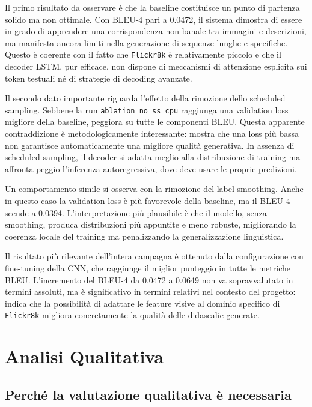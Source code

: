 \documentclass[11pt,a4paper]{report}
\newcommand{\dataset}{\texttt{Flickr8k}}
\begin{document}
Il primo risultato da osservare è che la baseline costituisce un punto di partenza solido ma non ottimale. Con BLEU-4 pari a 0.0472, il sistema dimostra di essere in grado di apprendere una corrispondenza non banale tra immagini e descrizioni, ma manifesta ancora limiti nella generazione di sequenze lunghe e specifiche. Questo è coerente con il fatto che \dataset{} è relativamente piccolo e che il decoder LSTM, pur efficace, non dispone di meccanismi di attenzione esplicita sui token testuali né di strategie di decoding avanzate.

Il secondo dato importante riguarda l'effetto della rimozione dello scheduled sampling. Sebbene la run \texttt{ablation\_no\_ss\_cpu} raggiunga una validation loss migliore della baseline, peggiora su tutte le componenti BLEU. Questa apparente contraddizione è metodologicamente interessante: mostra che una loss più bassa non garantisce automaticamente una migliore qualità generativa. In assenza di scheduled sampling, il decoder si adatta meglio alla distribuzione di training ma affronta peggio l'inferenza autoregressiva, dove deve usare le proprie predizioni.

Un comportamento simile si osserva con la rimozione del label smoothing. Anche in questo caso la validation loss è più favorevole della baseline, ma il BLEU-4 scende a 0.0394. L'interpretazione più plausibile è che il modello, senza smoothing, produca distribuzioni più appuntite e meno robuste, migliorando la coerenza locale del training ma penalizzando la generalizzazione linguistica.

Il risultato più rilevante dell'intera campagna è ottenuto dalla configurazione con fine-tuning della CNN, che raggiunge il miglior punteggio in tutte le metriche BLEU. L'incremento del BLEU-4 da 0.0472 a 0.0649 non va sopravvalutato in termini assoluti, ma è significativo in termini relativi nel contesto del progetto: indica che la possibilità di adattare le feature visive al dominio specifico di \dataset{} migliora concretamente la qualità delle didascalie generate.

\chapter{Analisi Qualitativa}

\section{Perché la valutazione qualitativa è necessaria}
\end{document}
